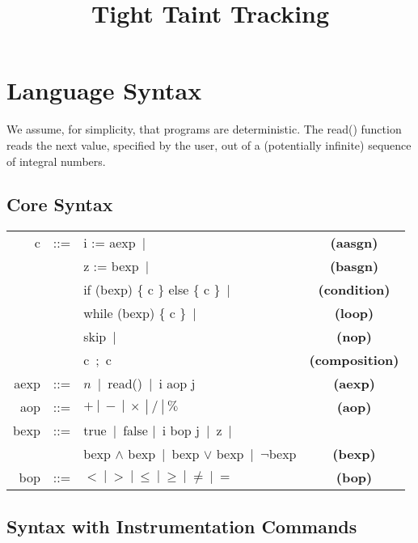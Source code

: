 \documentclass[]{article}
\title{Tight Taint Tracking}
\author{}
\begin{document}
\maketitle

\section{Language Syntax}

We assume, for simplicity, that programs are deterministic. The {\sf read()} function reads the next value, specified by the user, out of a (potentially infinite) sequence of integral numbers.

\subsection{Core Syntax}

\begin{tabular}{rclc}
{\sf c} & ::= & {\sf i := aexp}\ $|$ & {\bf (aasgn)}\\
		 & 		  & {\sf z := bexp}\ $|$ & {\bf (basgn)} \\
		 & 	 & {\sf if (bexp) \{ c \} else \{ c \}}\ $|$ & {\bf (condition)}\\
		 & 	 & {\sf while (bexp) \{ c \}}\ $|$ & {\bf (loop)}\\
		 		 & 	 & {\sf skip}\ $|$ & {\bf (nop)}\\
		 & 	 & {\sf c\ ;\ c} & {\bf (composition)}\\
{\sf aexp} & ::= & $n$\ $|$\ {\sf read()}\ $|$\ {\sf i aop j} & {\bf (aexp)} \\
{\sf aop} & ::= & $+\ |\ -\ |\ \times\ |\ /\ |\ \%$ & {\bf (aop)} \\
{\sf bexp} & ::= & {\sf true}\ $|$\ {\sf false} $|$\ {\sf i bop j}\ $|$\ {\sf z}\ $|$ & \\ %
& 		 & {\sf bexp} $\wedge$ {\sf bexp}\ $|$\ {\sf bexp} $\vee$ {\sf bexp}\ $|$\ $\neg${\sf bexp} & {\bf (bexp)} \\ %
{\sf bop} & ::= & $<\ |\ >\ |\ \leq\ |\ \geq\ |\ \neq\ |\ =$ & {\bf (bop)}
\end{tabular}

\subsection{Syntax with Instrumentation Commands}
\end{document}
